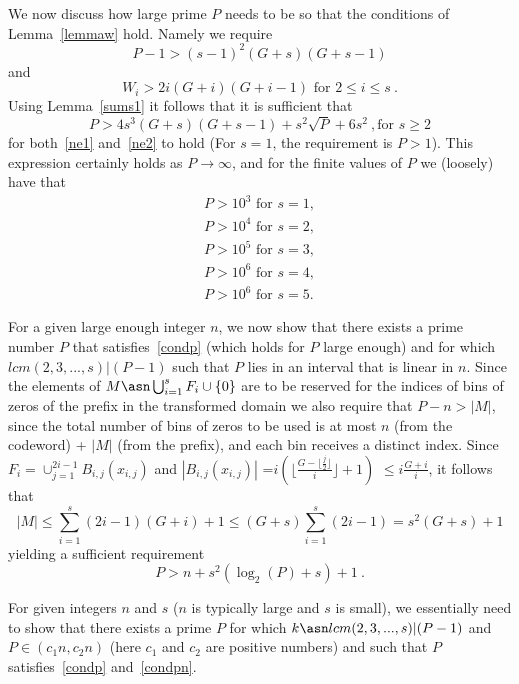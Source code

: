 We now discuss how large prime $P$ needs to be so that the
conditions of Lemma~\ref{lemmaw} hold. Namely we require
\begin{equation}\label{ne1}
P-1> (s-1)^2(G+s)(G+s-1) \end{equation} and
\begin{equation}\label{ne2}W_i>2i(G+i)(G+i-1) \text{ for }2 \leq i \leq s~. \end{equation} Using
Lemma~\ref{sums1} it follows that it is sufficient that
\begin{equation}\label{condp}
P > 4s^3(G+s)(G+s-1)+s^2\sqrt{P}+6s^2~, \text{for } s \geq 2
\end{equation}
for both~\eqref{ne1} and~\eqref{ne2} to hold (For $s=1$, the
requirement is $P>1$). This expression certainly holds as
$P\rightarrow \infty$, and for the finite values of $P$ we
(loosely) have that
\begin{eqnarray*}
P>10^3 \text{ for } s=1, \\P>10^4 \text{ for } s=2, \\P>10^5
\text{ for } s=3,\\ P>10^6 \text{ for } s=4,\\P>10^6 \text{ for }
s=5.
\end{eqnarray*}

 For a given large enough integer $n$, we now show that
there exists a prime number $P$ that satisfies~\eqref{condp} (which
holds for $P$ large enough) and for which $lcm(2,3,...,s) | (P-1)$
such that $P$ lies in an interval that is linear in $n$. Since the
elements of $M \asn \bigcup_{i=1}^s F_i \cup \{0\}$ are to be
reserved for the indices of bins of zeros of the prefix in the
transformed domain we also require that $P-n > |M|$, since the total
number of bins of zeros to be used is at most $n$ (from the
codeword) + $|M|$ (from the prefix), and each bin receives a
distinct index. Since $F_i= \cup_{j=1}^{2i-1} B_{i,j}(x_{i,j})$ and
$|B_{i,j}(x_{i,j})|$ =$i\left( \lfloor \frac{G-\lfloor
\frac{j}{2}\rfloor}{i}\rfloor+1\right)$ $\leq i \frac{G+i}{i}$, it
follows that \begin{equation}\label{eqM} |M| \leq \sum_{i=1}^s
(2i-1)(G+i) +1 \leq (G+s) \sum_{i=1}^s (2i-1)
=s^2(G+s)+1\end{equation} yielding a sufficient requirement
\begin{equation}\label{condpn}P>n+s^2(\log_2(P)+s)+1~.
\end{equation}

For given integers $n$ and $s$ ($n$ is typically large and $s$ is
small), we essentially need to show that there exists a prime $P$
for which $k \asn lcm(2,3,...,s) | (P-1)$ and $P \in (c_1n,c_2n)$
(here $c_1$ and $c_2$ are positive numbers) and such that $P$
satisfies~\eqref{condp} and~\eqref{condpn}.

